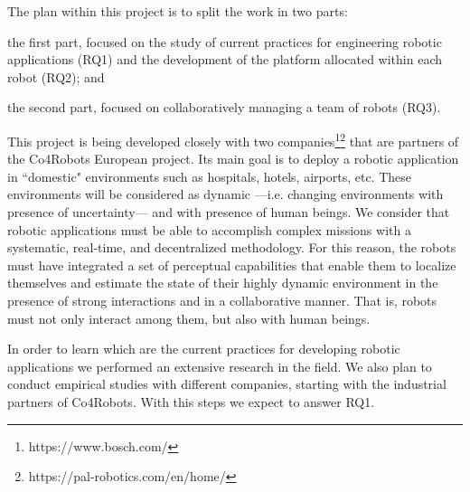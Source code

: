 The plan within this project is to split the work in two parts:
\begin{enumerate*}
\item the first part, focused on the study of current practices for engineering robotic applications (RQ1) and the development of the platform allocated within each robot (RQ2); and
\item the second part, focused on collaboratively managing a team of robots (RQ3).
\end{enumerate*}

This project is being developed closely with two companies\footnote{https://www.bosch.com/}\footnote{https://pal-robotics.com/en/home/} that are partners of the Co4Robots European project.
Its main goal is to deploy a robotic application in ``domestic" environments such as hospitals, hotels, airports, etc.
These environments will be considered as dynamic ---i.e. changing environments with presence of uncertainty--- and with presence of human beings.
We consider that robotic applications must be able to accomplish complex missions with a systematic, real-time, and decentralized methodology.
For this reason, the robots must have integrated a set of perceptual capabilities that enable them to localize themselves and estimate the state of their highly dynamic environment in the presence of strong interactions and in a collaborative manner.
That is, robots must not only interact among them, but also with human beings.

In order to learn which are the current practices for developing robotic applications we performed an extensive research in the field.
We also plan to conduct empirical studies with different companies, starting with the industrial partners of Co4Robots.
With this steps we expect to answer RQ1. %




